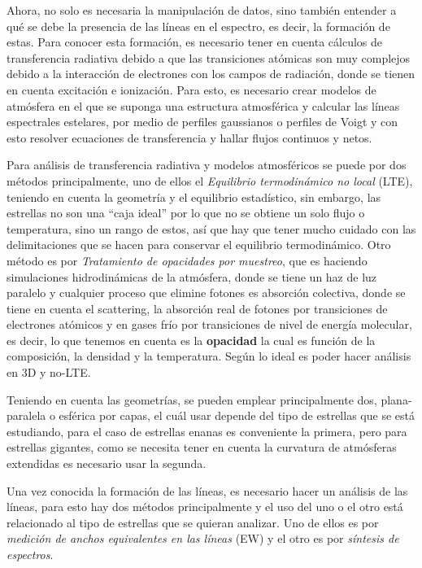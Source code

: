 \documentclass[12pt,oneside,openany,letter]{book}
\begin{document}
\noindent Ahora, no solo es necesaria la manipulación de datos, sino también entender a qué se debe la presencia de las líneas en el espectro, es decir, la formación de estas. Para conocer esta formación, es necesario tener en cuenta cálculos de transferencia radiativa debido a que las transiciones atómicas son muy complejos debido a la interacción de electrones con los campos de radiación, donde se tienen en cuenta excitación e ionización. Para esto, es necesario crear modelos de atmósfera en el que se suponga una estructura atmosférica y calcular las líneas espectrales estelares, por medio de perfiles gaussianos o perfiles de Voigt y con esto resolver ecuaciones de transferencia y hallar flujos continuos y netos. 

\noindent Para análisis de transferencia radiativa y modelos atmosféricos se puede por dos métodos principalmente, uno de ellos el \textit{Equilibrio termodinámico no local} (LTE), teniendo en cuenta la geometría y el equilibrio estadístico, sin embargo, las estrellas no son una ``caja ideal'' por lo que no se obtiene un solo flujo o temperatura, sino un rango de estos, así que hay que tener mucho cuidado con las delimitaciones que se hacen para conservar el equilibrio termodinámico. Otro método es por \textit{Tratamiento de opacidades por muestreo}, que es haciendo simulaciones hidrodinámicas de la atmósfera, donde se tiene un haz de luz paralelo y cualquier proceso que elimine fotones es absorción colectiva, donde se tiene en cuenta el scattering, la absorción real de fotones por transiciones de electrones atómicos y en gases frío por transiciones de nivel de energía molecular, es decir, lo que tenemos en cuenta es la \textbf{opacidad} la cual es función de la composición, la densidad y la temperatura. Según \citep{steffen2013micro} lo ideal es poder hacer análisis en 3D y no-LTE.

\noindent Teniendo en cuenta las geometrías, se pueden emplear principalmente dos, plana-paralela o esférica por capas, el cuál usar depende del tipo de estrellas que se está estudiando, para el caso de estrellas enanas es conveniente la primera, pero para estrellas gigantes, como se necesita tener en cuenta la curvatura de atmósferas extendidas es necesario usar la segunda. 

\noindent Una vez conocida la formación de las líneas, es necesario hacer un análisis de las líneas, para esto hay dos métodos principalmente y el uso del uno o el otro está relacionado al tipo de estrellas que se quieran analizar. Uno de ellos es por \textit{medición de anchos equivalentes en las líneas} (EW) y el otro es por \textit{síntesis de espectros}.
\end{document}

